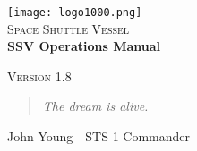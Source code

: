 \documentclass{article}
\begin{document}
\begin{titlepage}

\begin{center}

\texttt{[image: logo1000.png]}\\[1cm]

\textsc{\LARGE Space Shuttle Vessel}\\[1.5cm]

\huge \bfseries SSV Operations Manual\\[0.4cm]

\vfill

\textsc{\Large Version 1.8}\\[0.5cm]

\end{center}
\end{titlepage}


\newpage
\thispagestyle{empty}
\vspace*{\fill}
\begin{quote}
\centering
\textit{The dream is alive.}
\end{quote}
\begin{flushright}
John Young - STS-1 Commander
\end{flushright}
\vspace*{\fill}
\newpage





\newpage
\tableofcontents


\newpage

\newpage

\newpage

\newpage

\newpage

\newpage

\newpage

\newpage

\newpage

\newpage

\newpage

\newpage

\end{document}

